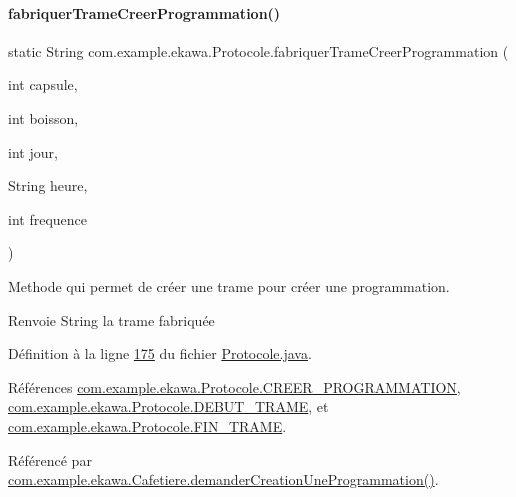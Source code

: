 \paragraph{\texorpdfstring{fabriquer\+Trame\+Creer\+Programmation()}{fabriquerTrameCreerProgrammation()}}
{\footnotesize\ttfamily static String com.\+example.\+ekawa.\+Protocole.\+fabriquer\+Trame\+Creer\+Programmation (\begin{DoxyParamCaption}\item[{int}]{capsule,  }\item[{int}]{boisson,  }\item[{int}]{jour,  }\item[{String}]{heure,  }\item[{int}]{frequence }\end{DoxyParamCaption})\hspace{0.3cm}{\ttfamily [static]}}



Methode qui permet de créer une trame pour créer une programmation. 

\begin{DoxyReturn}{Renvoie}
String la trame fabriquée 
\end{DoxyReturn}


Définition à la ligne \hyperlink{_protocole_8java_source_l00175}{175} du fichier \hyperlink{_protocole_8java_source}{Protocole.\+java}.



Références \hyperlink{_protocole_8java_source_l00032}{com.\+example.\+ekawa.\+Protocole.\+C\+R\+E\+E\+R\+\_\+\+P\+R\+O\+G\+R\+A\+M\+M\+A\+T\+I\+ON}, \hyperlink{_protocole_8java_source_l00025}{com.\+example.\+ekawa.\+Protocole.\+D\+E\+B\+U\+T\+\_\+\+T\+R\+A\+ME}, et \hyperlink{_protocole_8java_source_l00026}{com.\+example.\+ekawa.\+Protocole.\+F\+I\+N\+\_\+\+T\+R\+A\+ME}.



Référencé par \hyperlink{_cafetiere_8java_source_l00720}{com.\+example.\+ekawa.\+Cafetiere.\+demander\+Creation\+Une\+Programmation()}.


